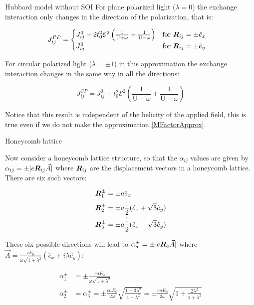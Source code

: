 \begin{section}{Hubbard model without SOI}
For plane polarized light ($\lambda = 0$) the exchange interaction only changes in the direction of the polarization, that is:

\begin{equation}
J_{ij}^{PP} = \begin{cases}
		J_{ij}^0 + 2t_0^2 \mathcal{E}^2 \left( \frac{1}{\text{U}+\omega} + \frac{1}{\text{U}-\omega} \right) & \text{for } \boldsymbol{R}_{ij} = \pm \hat{e}_x \\
J_{ij}^0 & \text{for } \boldsymbol{R}_{ij} = \pm \hat{e}_y
\end{cases} \quad 
\end{equation}

For circular polarized light ($\lambda=\pm1$) in this approximation the exchange interaction changes in the same way in all the directions:

\begin{equation}
\label{JijCPSQUARE}
J_{ij}^{CP} = J_{ij}^0 + t_0^2 \mathcal{E}^2 \left( \frac{1}{\text{U}+\omega} + \frac{1}{\text{U}-\omega} \right)
\end{equation}

Notice that this result is independent of the helicity of the applied field, this is true even if we do not make the approximation \ref{MFactorApprox}. 

\begin{subsection}{Honeycomb lattice}

Now consider a honeycomb lattice structure, so that the $\alpha_{ij}$ values are given by $\alpha_{ij} = \pm|e\boldsymbol{R}_{ij}\vec{A}|$ where $\boldsymbol{R}_{ij}$ are the displacement vectors in a honeycomb lattice. There are six such vectors:

\begin{align}
\boldsymbol{R}_1^\pm &= \pm a\hat{e}_x \\
\boldsymbol{R}_2^\pm &= \pm a\frac{1}{2}(\hat{e}_x + \sqrt{3}\hat{e}_y) \\
\boldsymbol{R}_3^\pm &= \pm a\frac{1}{2}(\hat{e}_x - \sqrt{3}\hat{e}_y)
\end{align}

These six possible directions will lead to $\alpha_a^\pm = \pm |e\boldsymbol{R}_a\vec{A}|$ where $\vec{A}=\frac{iE_0}{\omega\sqrt{1+\lambda^2}}(\hat{e}_x+i\lambda\hat{e}_y)$:

\begin{align}
\alpha_1^\pm &= \pm \frac{eaE_0}{\omega\sqrt{1+\lambda^2}} \\
\alpha_2^\pm &= \alpha_3^\pm = \pm \frac{eaE_0}{2\omega} \sqrt{\frac{1+3\lambda^2}{1+\lambda^2}} = \pm\frac{eaE_0}{2\omega}\sqrt{1+\frac{2\lambda^2}{1+\lambda^2}}
\end{align}


\end{subsection}
\end{section}
